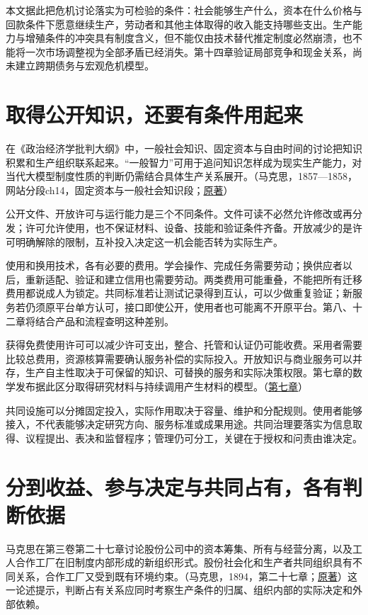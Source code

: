 \documentclass[UTF8,fontset=windows,12pt,a4paper,oneside,openany]{ctexbook}
\begin{document}
本文据此把危机讨论落实为可检验的条件：社会能够生产什么，资本在什么价格与回款条件下愿意继续生产，劳动者和其他主体取得的收入能支持哪些支出。生产能力与增殖条件的冲突具有制度含义，但不能仅由技术替代推定制度必然崩溃，也不能将一次市场调整视为全部矛盾已经消失。第十四章验证局部竞争和现金关系，尚未建立跨期债务与宏观危机模型。

\section{取得公开知识，还要有条件用起来}

在《政治经济学批判大纲》中，一般社会知识、固定资本与自由时间的讨论把知识积累和生产组织联系起来。“一般智力”可用于追问知识怎样成为现实生产能力，对当代大模型制度性质的判断仍需结合具体生产关系展开。（马克思，1857—1858，网站分段ch14，固定资本与一般社会知识段；\href{https://www.marxists.org/archive/marx/works/1857/grundrisse/ch14.htm}{原著}）

公开文件、开放许可与运行能力是三个不同条件。文件可读不必然允许修改或再分发；许可允许使用，也不保证材料、设备、技能和验证条件齐备。开放减少的是许可明确解除的限制，互补投入决定这一机会能否转为实际生产。

使用和换用技术，各有必要的费用。学会操作、完成任务需要劳动；换供应者以后，重新适配、验证和建立信用也需要劳动。两类费用可能重叠，不能把所有迁移费用都说成人为锁定。共同标准若让测试记录得到互认，可以少做重复验证；新服务若仍须原平台单方认可，接口即使公开，使用者也可能离不开原平台。第八、十二章将结合产品和流程查明这种差别。

获得免费使用许可可以减少许可支出，整合、托管和认证仍可能收费。采用者需要比较总费用，资源核算需要确认服务补偿的实际投入。开放知识与商业服务可以并存，生产自主性取决于可保留的知识、可替换的服务和实际决策权限。第七章的数学发布据此区分取得研究材料与持续调用产生材料的模型。（\hyperref[ch:7]{第七章}）

共同设施可以分摊固定投入，实际作用取决于容量、维护和分配规则。使用者能够接入，不代表能够决定研究方向、服务标准或成果用途。共同治理要落实为信息取得、议程提出、表决和监督程序；管理仍可分工，关键在于授权和问责由谁决定。

\section{分到收益、参与决定与共同占有，各有判断依据}

马克思在第三卷第二十七章讨论股份公司中的资本筹集、所有与经营分离，以及工人合作工厂在旧制度内部形成的新组织形式。股份社会化和生产者共同组织具有不同关系，合作工厂又受到既有环境约束。（马克思，1894，第二十七章；\href{https://www.marxists.org/archive/marx/works/1894-c3/ch27.htm}{原著}）这一论述提示，判断占有关系应同时考察生产条件的归属、组织内部的实际决定和外部依赖。
\end{document}
